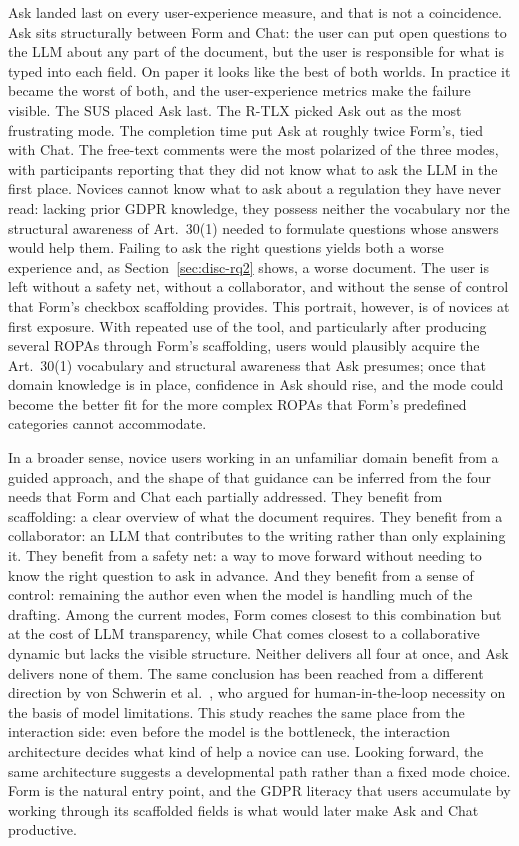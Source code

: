 Ask landed last on every user-experience measure, and that is
not a coincidence. Ask sits structurally between Form and Chat:
the user can put open questions to the LLM about any part of the
document, but the user is responsible for what is typed into
each field. On paper it looks like the best of both worlds. In
practice it became the worst of both, and the user-experience
metrics make the failure visible. The SUS placed Ask last. The
R-TLX picked Ask out as the most frustrating mode. The
completion time put Ask at roughly twice Form's, tied with Chat.
The free-text comments were the most polarized of the three
modes, with participants reporting that they did not know what
to ask the LLM in the first place.
Novices cannot know what to ask about a regulation they have never read:
lacking prior GDPR knowledge, they possess neither the vocabulary nor
the structural awareness of Art.~30(1) needed to formulate questions
whose answers would help them.
Failing to ask the right questions yields both
a worse experience and, as Section~\ref{sec:disc-rq2} shows, a
worse document. The user is left without a safety net, without
a collaborator, and without the sense of control that Form's
checkbox scaffolding provides.
This portrait, however, is of novices at first exposure. With
repeated use of the tool, and particularly after producing
several ROPAs through Form's scaffolding, users would
plausibly acquire the Art.~30(1) vocabulary and structural
awareness that Ask presumes; once that domain knowledge is in
place, confidence in Ask should rise, and the mode could
become the better fit for the more complex ROPAs that Form's
predefined categories cannot accommodate.


In a broader sense, novice users working in an unfamiliar domain benefit from a guided approach,
and the shape of that guidance can be inferred from the four needs that Form and Chat each partially addressed.
They benefit from scaffolding: a clear overview of what the document requires.
They benefit from a collaborator: an LLM that contributes to the writing rather than only explaining it.
They benefit from a safety net: a way to move forward without needing to know the right question to ask in advance.
And they benefit from a sense of control: remaining the author even when the model is handling much of the drafting.
Among the current modes, Form comes closest to this combination but at the cost of LLM transparency,
while Chat comes closest to a collaborative dynamic but lacks the visible structure.
Neither delivers all four at once, and Ask delivers none of them.
The same conclusion has been reached from a different direction by von
Schwerin et al.~\cite{schwerinSystematicComparisonOpen2024}, who
argued for human-in-the-loop necessity on the basis of model
limitations. This study reaches the same place from the
interaction side: even before the model is the bottleneck, the
interaction architecture decides what kind of help a novice
can use. Looking forward, the same architecture suggests a
developmental path rather than a fixed mode choice. Form is
the natural entry point, and the GDPR literacy that users
accumulate by working through its scaffolded fields is what
would later make Ask and Chat productive.


